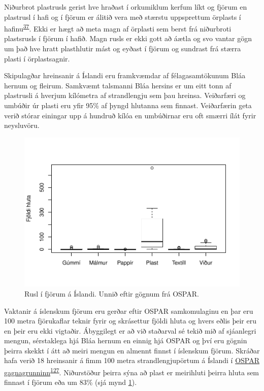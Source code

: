 \documentclass[icelandic,]{book}
\begin{document}
Niðurbrot plastrusls gerist hve hraðast í orkumiklum kerfum líkt og fjörum en plastrusl í hafi og í fjörum er álitið vera með stærstu uppsprettum örplasts í hafinu\textsuperscript{\protect\hyperlink{ref-andrady2011microplastics}{37}}. Ekki er hægt að meta magn af örplasti sem berst frá niðurbroti plastsrusls í fjörum í hafið. Magn rusls er ekki gott að áætla og svo vantar gögn um það hve hratt plasthlutir mást og eyðast í fjörum og sundrast frá stærra plasti í örplastsagnir.

Skipulagðar hreinsanir á Íslandi eru framkvæmdar af félagasamtökunum Bláa hernum og fleirum. Samkvæmt talsmanni Bláa hersins er um eitt tonn af plastrusli á hverjum kílómetra af strandlengju sem þau hreinsa. Veiðarfæri og umbúðir úr plasti eru yfir 95\% af þyngd hlutanna sem finnast. Veiðarfærin geta verið stórar einingar upp á hundruð kílóa en umbúðirnar eru oft smærri ílát fyrir neysluvöru.

\begin{figure}[H]
\centering
\includegraphics{_bookdown_files/OrplastHaf_files/figure-latex/ospartafla-1.pdf}
\caption{\label{fig:ospartafla}Rusl í fjörum á Íslandi. Unnið eftir gögnum frá OSPAR.}
\end{figure}

Vaktanir á íslenskum fjörum eru gerðar eftir OSPAR samkomulaginu en þar eru 100 metra fjörukaflar teknir fyrir og skrásettur fjöldi hluta og hvers eðlis þeir eru en þeir eru ekki vigtaðir. Ábyggilegt er að við staðarval sé tekið mið af sjáanlegri mengun, sérstaklega hjá Bláa hernum en einnig hjá OSPAR og því eru gögnin þeirra skekkt í átt að meiri mengun en almennt finnst í íslenskum fjörum. Skráðar hafa verið 18 hreinsanir á fimm 100 metra strandlengjupörtum á Íslandi í \href{http://www.mcsuk.org/ospar/map}{OSPAR gagnagrunninn}\textsuperscript{\protect\hyperlink{ref-ospar2019}{127}}. Niðurstöður þeirra sýna að plast er meirihluti þeirra hluta sem finnast í fjörum eða um 83\% (sjá mynd \ref{fig:ospartafla}).
\end{document}
